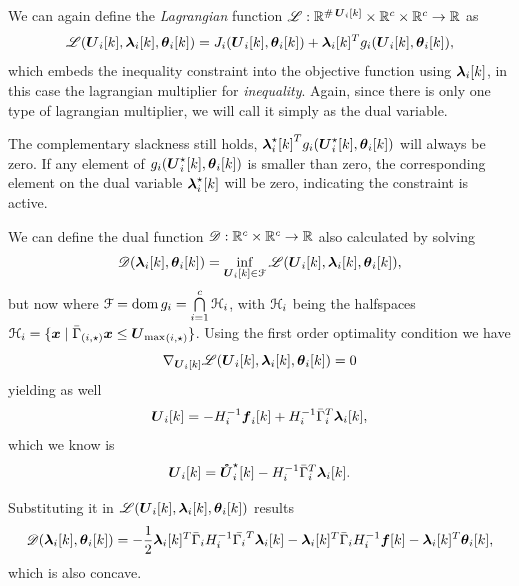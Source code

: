 \documentclass[../main.tex]{subfiles}
\begin{document}
We can again define the \emph{Lagrangian} function $\lagrangianname : \R^{\card\vec{U}_{i}[k]}\times \R^{c} \times \R^{c} \to \R$ as
\begin{equation}
  \label{eq:lagrangian_equality}
  \lagrangian=\obji(\vec{U}_{i}[k],\thetaik)+\lambdaik^T\inequalityfunction,
\end{equation}
which embeds the inequality constraint into the objective function using $\lambdaik$, in this case the lagrangian multiplier for \emph{inequality}.
Again, since there is only one type of lagrangian multiplier, we will call it simply as the dual variable.

\begin{remark}
  The complementary slackness still holds, ${\lambdaikstar}^T\inequalityfunctionname(\vec{U}_{i}^{\star}[k],\thetaik)$ will always be zero.
  If any element of $\inequalityfunctionname(\vec{U}_{i}^{\star}[k],\thetaik)$ is smaller than zero, the corresponding element on the dual variable $\lambdaikstar$ will be zero, indicating the constraint is active.
\end{remark}

We can define the dual function $\dualfunctionname:\R^{c} \times \R^{c} \to \R$ also calculated by solving
\begin{equation}
  \label{eq:dual_function_equality}
  \dualfunction=\inf_{\vec{U}_{i}[k]\in\set{F}} \lagrangian,
\end{equation}
but now where $\set{F}=\dom \inequalityfunctionname=\bigcap\limits_{i=1}^{c}\set{H}_{i}$, with $\set{H}_{i}$ being the halfspaces
${\set{H}_i=\setbuild{\vec{x}}{\elem[i,\star]{{\bar{\Gamma}}}\vec{x}\leq\elem[i,\star]{\vec{U}_{\max}}}}$.
Using the first order \KKT{} optimality condition we have
\begin{equation}
  \nabla_{\vec{U}_{i}[k]}\lagrangian=0
\end{equation}
yielding as well
\begin{equation}
  \vec{U}_{i}[k]=-H_{i}^{-1}\vec{f}_{i}[k]+H_{i}^{-1}\bar{\Gamma}_{i}^{T}\lambdaik,
\end{equation}
which we know is
\begin{equation}
  \vec{U}_{i}[k]=\optuncUik-H_{i}^{-1}\bar{\Gamma}_{i}^{T}\lambdaik.
\end{equation}

Substituting it in $\lagrangian$ results
\begin{equation}
  \label{eq:dual_function_solution_lambda_theta_ineq}
  \dualfunction=-\frac{1}{2}\lambdaik^{T}\linearcoefi\lambdaik-\lambdaik^{T}\bar{\Gamma}_{i}H_{i}^{-1}\vec{f}[k]-\lambdaik^{T}\thetaik,
\end{equation}
which is also concave.
\end{document}
